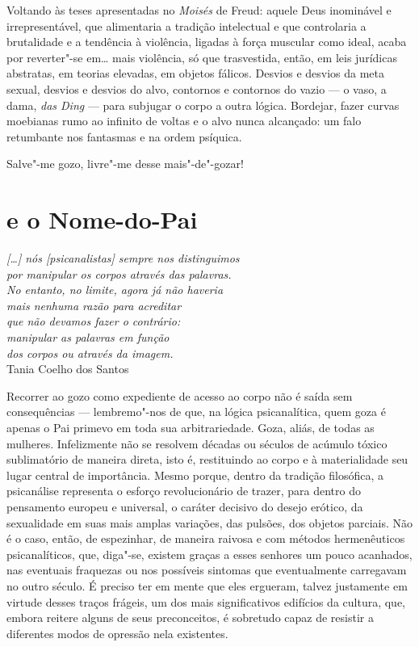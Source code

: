 Voltando às teses apresentadas no \emph{Moisés} de Freud: aquele Deus
inominável e irrepresentável, que alimentaria a tradição intelectual e
que controlaria a brutalidade e a tendência à violência, ligadas à força
muscular como ideal, acaba por reverter"-se em\ldots{} mais violência, só que
trasvestida, então, em leis jurídicas abstratas, em teorias elevadas, em
objetos fálicos. Desvios e desvios da meta sexual, desvios e desvios do
alvo, contornos e contornos do vazio --- o vaso, a dama, \emph{das Ding}
--- para subjugar o corpo a outra lógica. Bordejar, fazer curvas
moebianas rumo ao infinito de voltas e o alvo nunca alcançado: um falo
retumbante nos fantasmas e na ordem psíquica.

Salve"-me gozo, livre"-me desse mais"-de"-gozar!

\section{ e o Nome-do-Pai}

\begin{flushright}
\footnotesize
\emph{{[}\ldots{}{]} nós {[}psicanalistas{]} sempre nos distinguimos\\
por manipular os corpos através das palavras.\\
No entanto, no limite, agora já não haveria\\
mais nenhuma razão para acreditar \\
que não devamos fazer o contrário: \\
manipular as palavras em função \\
dos corpos ou através da imagem.}\\
Tania Coelho dos Santos
\end{flushright}

Recorrer ao gozo como expediente de acesso ao corpo não é saída sem
consequências --- lembremo"-nos de que, na lógica psicanalítica, quem goza
é apenas o Pai primevo em toda sua arbitrariedade. Goza, aliás, de todas
as mulheres. Infelizmente não se resolvem décadas ou séculos de acúmulo
tóxico sublimatório de maneira direta, isto é, restituindo ao corpo e à
materialidade seu lugar central de importância. Mesmo porque, dentro da
tradição filosófica, a psicanálise representa o esforço revolucionário
de trazer, para dentro do pensamento europeu e universal, o caráter
decisivo do desejo erótico, da sexualidade em suas mais amplas
variações, das pulsões, dos objetos parciais. Não é o caso, então, de
espezinhar, de maneira raivosa e com métodos hermenêuticos
psicanalíticos, que, diga"-se, existem graças a esses senhores um pouco
acanhados, nas eventuais fraquezas ou nos possíveis sintomas que
eventualmente carregavam no outro século. É preciso ter em mente que
eles ergueram, talvez justamente em virtude desses traços frágeis, um
dos mais significativos edifícios da cultura, que, embora reitere alguns
de seus preconceitos, é sobretudo capaz de resistir a diferentes modos
de opressão nela existentes.

